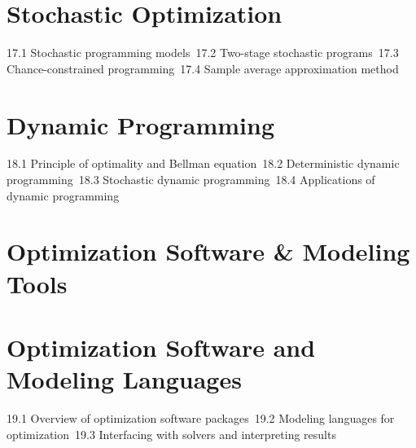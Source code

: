 \section{Stochastic Optimization}
17.1 Stochastic programming models\
17.2 Two-stage stochastic programs\
17.3 Chance-constrained programming\
17.4 Sample average approximation method\
\section{Dynamic Programming}
18.1 Principle of optimality and Bellman equation\
18.2 Deterministic dynamic programming\
18.3 Stochastic dynamic programming\
18.4 Applications of dynamic programming\
\section{Optimization Software \& Modeling Tools}
\section{Optimization Software and Modeling Languages}
19.1 Overview of optimization software packages\
19.2 Modeling languages for optimization\
19.3 Interfacing with solvers and interpreting results\

